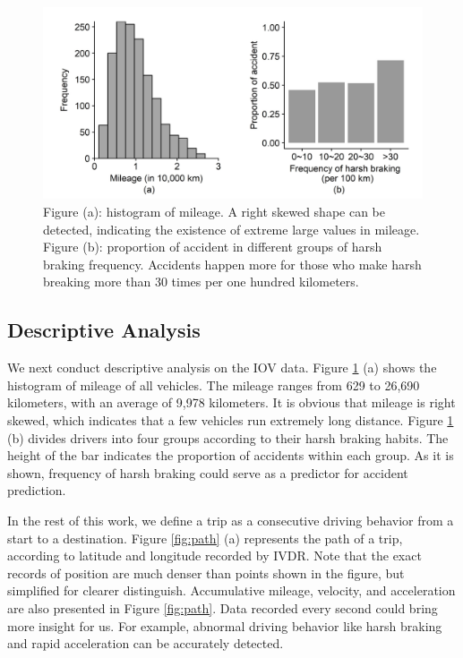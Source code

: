\documentclass[sii]{ipart}
\theoremstyle{plain}
\begin{document}
\begin{figure}[t!]
	\centering

	\includegraphics[width=0.7\linewidth]{hist_mileage&y_brake}
	\small\caption{Figure (a): histogram of mileage. A right skewed shape can be detected, indicating the existence of extreme large values in mileage. Figure (b): proportion of accident in different groups of harsh braking frequency. Accidents happen more for those who make harsh breaking more than 30 times per one hundred kilometers.}
	\label{fig:histmileage}
\end{figure}

\subsection{Descriptive Analysis} 
We next conduct descriptive analysis on the IOV data. Figure \ref{fig:histmileage} (a) shows the histogram of mileage of all vehicles. The mileage ranges from 629 to 26,690 kilometers, with an average of 9,978 kilometers. It is obvious that mileage is right skewed, which indicates that a few vehicles run extremely long distance. Figure \ref{fig:histmileage} (b) divides drivers into four groups according to their harsh braking habits. The height of the bar indicates the proportion of accidents within each group. As it is shown, frequency of harsh braking could serve as a predictor for accident prediction.





In the rest of this work, we define a trip as a consecutive driving behavior from a start to a destination. Figure \ref{fig:path} (a) represents the path of a trip, according to latitude and longitude recorded by IVDR. Note that the exact records of position are much denser than points shown in the figure, but simplified for clearer distinguish. Accumulative mileage, velocity, and acceleration are also presented in Figure \ref{fig:path}. Data recorded every second could bring more insight for us. For example, abnormal driving behavior like harsh braking and rapid acceleration can be accurately detected.
\end{document}
